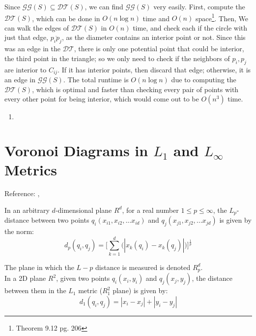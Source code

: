 \documentclass [12pt]{article}
\begin{document}
        Since $\mathcal{GG}(S)\subseteq \mathcal{DT}(S)$, we can find $\mathcal{GG}(S)$ very easily. First, compute the $\mathcal{DT}(S)$, which can be done in $O(n\log n)$ time and $O(n)$ space\footnote{Theorem 9.12 \cite{berg08} pg. 206}. Then, We can walk the edges of $\mathcal{DT}(S)$ in $O(n)$ time, and check each if the circle with just that edge, $\overline{p_i p_j}$, as the diameter contains an interior point or not. Since this was an edge in the $\mathcal{DT}$, there is only one potential point that could be interior, the third point in the triangle; so we only need to check if the neighbors of $p_i, p_j$ are interior to $C_{ij}$. If it has interior points, then discard that edge; otherwise, it is an edge in $\mathcal{GG}(S)$. The total runtime is $O(n\log n)$ due to computing the $\mathcal{DT}(S)$, which is optimal and faster than checking every pair of points with every other point for being interior, which would come out to be $O(n^3)$ time.

        


        \begin{enumerate}[label=\alph*.]
            \item 
        \end{enumerate}
        
    \pagebreak

    
    \section{Voronoi Diagrams in $L_1$ and $L_\infty$ Metrics}
    \label{sec:two}

    Reference: \cite{leewong}, \cite{voronoiinteract}

    In an arbitrary $d$-dimensional plane $R^d$, for a real number $1 \leq p \leq \infty$, the $L_p$-distance between two points $q_i(x_{i1}, x_{i2}, ... x_{id})$ and $q_j(x_{j1}, x_{j2}, ... x_{jd})$ is given by the norm: $$ d_{p}(q_i, q_j) = \Big[ \sum_{k = 1}^{d} \Big( |x_k(q_i) - x_k(q_j)| \Big) \Big]^{\frac{1}{p}} $$

    The plane in which the $L-p$ distance is measured is denoted $R^d_p$. \\


    In a 2D plane $R^{2}$, given two points $q_i(x_i, y_i)$ and $q_j(x_j, y_j)$, the distance between them in the $L_1$ metric ($R^2_1$ plane) is given by: $$ d_{1}(q_i, q_j) = |x_i - x_j| + |y_i - y_j| $$
\end{document}
